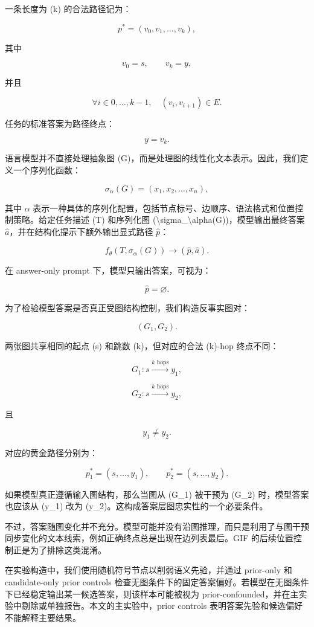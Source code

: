 \documentclass[
  11pt,
]{article}
\begin{document}
一条长度为 (k) 的合法路径记为：

\[
p^*=(v_0,v_1,\dots,v_k),  
\]

其中

\[
v_0=s,\qquad v_k=y,  
\]

并且

\[
\forall i\in{0,\dots,k-1},\quad (v_i,v_{i+1})\in E.  
\]

任务的标准答案为路径终点：

\[
y=v_k.  
\]

语言模型并不直接处理抽象图
(G)，而是处理图的线性化文本表示。因此，我们定义一个序列化函数：

\[
\sigma_\alpha(G)=(x_1,x_2,\dots,x_n),  
\]

其中 \(\alpha\)
表示一种具体的序列化配置，包括节点标号、边顺序、语法格式和位置控制策略。给定任务描述
(T) 和序列化图
(\textbackslash sigma\_\textbackslash alpha(G))，模型输出最终答案
\(\hat{a}\)，并在结构化提示下额外输出显式路径 \(\hat{p}\)：

\[
f_\theta(T,\sigma_\alpha(G))\rightarrow(\hat{p},\hat{a}).  
\]

在 answer-only prompt 下，模型只输出答案，可视为：

\[
\hat{p}=\varnothing.  
\]

为了检验模型答案是否真正受图结构控制，我们构造反事实图对：

\[
(G_1,G_2).  
\]

两张图共享相同的起点 (s) 和跳数 (k)，但对应的合法 (k)-hop 终点不同：

\[
G_1: s \xrightarrow{k\text{ hops}} y_1,  
\]

\[
G_2: s \xrightarrow{k\text{ hops}} y_2,  
\]

且

\[
y_1\neq y_2.  
\]

对应的黄金路径分别为：

\[
p_1^* = (s, \dots, y_1), \qquad p_2^* = (s, \dots, y_2).
\]

如果模型真正遵循输入图结构，那么当图从 (G\_1) 被干预为 (G\_2)
时，模型答案也应该从 (y\_1) 改为
(y\_2)。这构成答案层图忠实性的一个必要条件。

不过，答案随图变化并不充分。模型可能并没有沿图推理，而只是利用了与图干预同步变化的文本线索，例如正确终点总是出现在边列表最后。GIF
的后续位置控制正是为了排除这类混淆。

在实验构造中，我们使用随机符号节点以削弱语义先验，并通过 prior-only 和
candidate-only prior controls
检查无图条件下的固定答案偏好。若模型在无图条件下已经稳定输出某一候选答案，则该样本可能被视为
prior-confounded，并在主实验中剔除或单独报告。本文的主实验中，prior
controls 表明答案先验和候选偏好不能解释主要结果。
\end{document}
